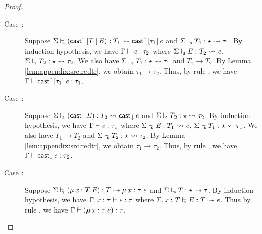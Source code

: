 \begin{proof}
\begin{description}
        \item[Case :] Suppose $ \Sigma  \vdash_{\!\!\mathsf{s} }  (  \mathsf{cast}^{\uparrow} \, [  T_{{\mathrm{1}}}  ] \,  \mathit{E}  )  :  T_{{\mathrm{1}}}   \rightsquigarrow   \mathsf{cast}^{\uparrow} \, [  \tau_{{\mathrm{1}}}  ] \,  \mathit{e} $ and $ \Sigma  \vdash_{\!\!\mathsf{s} }  T_{{\mathrm{1}}}  :  \star   \rightsquigarrow   \tau_{{\mathrm{1}}} $. By induction hypothesis, we have $\Gamma  \vdash  \mathit{e}  :  \tau_{{\mathrm{2}}}$ where $ \Sigma  \vdash_{\!\!\mathsf{s} }  \mathit{E}  :  T_{{\mathrm{2}}}   \rightsquigarrow   \mathit{e} $, $ \Sigma  \vdash_{\!\!\mathsf{s} }  T_{{\mathrm{2}}}  :  \star   \rightsquigarrow   \tau_{{\mathrm{2}}} $. We also have $ \Sigma  \vdash_{\!\!\mathsf{s} }  T_{{\mathrm{1}}}  :  \star   \rightsquigarrow   \tau_{{\mathrm{1}}} $ and $T_{{\mathrm{1}}}  \longrightarrow  T_{{\mathrm{2}}}$. By Lemma \ref{lem:appendix:src:redtr}, we obtain $\tau_{{\mathrm{1}}}  \longrightarrow  \tau_{{\mathrm{2}}}$. Thus, by rule , we have $\Gamma  \vdash  \mathsf{cast}^{\uparrow} \, [  \tau_{{\mathrm{1}}}  ] \,  \mathit{e}  :  \tau_{{\mathrm{1}}}$.
        \item[Case :] Suppose $ \Sigma  \vdash_{\!\!\mathsf{s} }  (  \mathsf{cast}_{\downarrow} \, \mathit{E}  )  :  T_{{\mathrm{2}}}   \rightsquigarrow   \mathsf{cast}_{\downarrow} \, \mathit{e} $ and $ \Sigma  \vdash_{\!\!\mathsf{s} }  T_{{\mathrm{2}}}  :  \star   \rightsquigarrow   \tau_{{\mathrm{2}}} $. By induction hypothesis, we have $\Gamma  \vdash  \mathit{e}  :  \tau_{{\mathrm{1}}}$ where $ \Sigma  \vdash_{\!\!\mathsf{s} }  \mathit{E}  :  T_{{\mathrm{1}}}   \rightsquigarrow   \mathit{e} $, $ \Sigma  \vdash_{\!\!\mathsf{s} }  T_{{\mathrm{1}}}  :  \star   \rightsquigarrow   \tau_{{\mathrm{1}}} $. We also have $T_{{\mathrm{1}}}  \longrightarrow  T_{{\mathrm{2}}}$ and $ \Sigma  \vdash_{\!\!\mathsf{s} }  T_{{\mathrm{2}}}  :  \star   \rightsquigarrow   \tau_{{\mathrm{2}}} $. By Lemma \ref{lem:appendix:src:redtr}, we obtain $\tau_{{\mathrm{1}}}  \longrightarrow  \tau_{{\mathrm{2}}}$. Thus, by rule , we have $\Gamma  \vdash  \mathsf{cast}_{\downarrow} \, \mathit{e}  :  \tau_{{\mathrm{2}}}$.
        \item[Case :] Suppose $ \Sigma  \vdash_{\!\!\mathsf{s} }  (  \mu \, \mathit{x}  :  T  .  \mathit{E}  )  :  T   \rightsquigarrow   \mu \, \mathit{x}  :  \tau  .  \mathit{e} $ and $ \Sigma  \vdash_{\!\!\mathsf{s} }  T  :  \star   \rightsquigarrow   \tau $. By induction hypothesis, we have $\Gamma  ,  \mathit{x}  :  \tau  \vdash  \mathit{e}  :  \tau$ where $ \Sigma  ,  \mathit{x}  :  T  \vdash_{\!\!\mathsf{s} }  \mathit{E}  :  T   \rightsquigarrow   \mathit{e} $. Thus by rule , we have $\Gamma  \vdash  (  \mu \, \mathit{x}  :  \tau  .  \mathit{e}  )  :  \tau$.

\end{description}
\end{proof}
